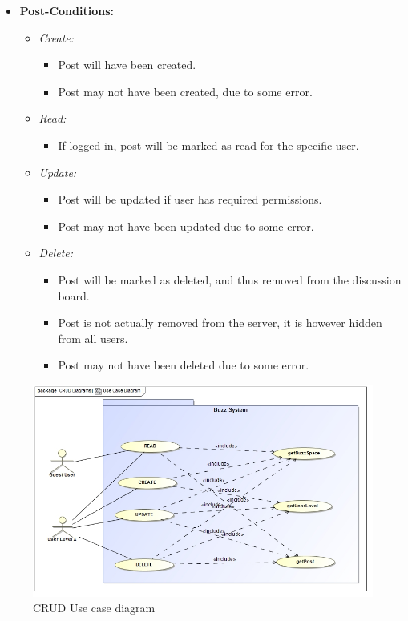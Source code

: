 \documentclass[11pt]{article}
\begin{document}
\begin{enumerate}
\begin{itemize}
\begin{itemize}
		\end{itemize}
		\item \textbf{Post-Conditions: }
		\begin{itemize}
		\item \textit{Create: }
			\begin{itemize}
			\item Post will have been created.
			\item Post may not have been created, due to some error.
			\end{itemize}
		\item \textit{Read: }
			\begin{itemize}
			\item If logged in, post will be marked as read for the 				specific user.
			\end{itemize}
		\item \textit{Update: }
			\begin{itemize}
			\item Post will be updated if user has required 						permissions.
			\item Post may not have been updated due to some error.
			\end{itemize}
		\item \textit{Delete: }
			\begin{itemize}
			\item Post will be marked as deleted, and thus removed 					from the discussion board.
			\item Post is not actually removed from the server, it is 					however hidden from all users.
		\item Post may not have been deleted due to some error. 
			\end{itemize}			
			
		\end{itemize}
	
	\end{itemize}
\graphicspath{ {../Diagrams/Kyhle/Use_Case_Diagrams/} }	
	\begin{figure}[H]	
    	\includegraphics[scale=0.5]{CRUD.jpg}
    	\caption{CRUD Use case diagram}
	\end{figure}
	

\end{enumerate}
\end{document}
